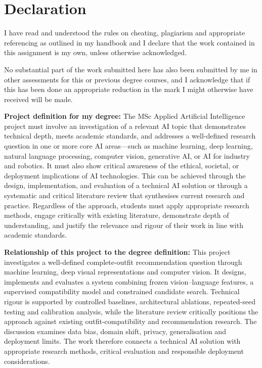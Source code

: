 \chapter*{Declaration}

I have read and understood the rules on cheating, plagiarism and appropriate
referencing as outlined in my handbook and I declare that the work contained
in this assignment is my own, unless otherwise acknowledged.

No substantial part of the work submitted here has also been submitted by me
in other assessments for this or previous degree courses, and I acknowledge
that if this has been done an appropriate reduction in the mark I might
otherwise have received will be made.

\textbf{Project definition for my degree:} The MSc Applied Artificial
Intelligence project must involve an investigation of a relevant AI topic that
demonstrates technical depth, meets academic standards, and addresses a
well-defined research question in one or more core AI areas---such as machine
learning, deep learning, natural language processing, computer vision,
generative AI, or AI for industry and robotics. It must also show critical
awareness of the ethical, societal, or deployment implications of AI
technologies. This can be achieved through the design, implementation, and
evaluation of a technical AI solution or through a systematic and critical
literature review that synthesises current research and practice. Regardless
of the approach, students must apply appropriate research methods, engage
critically with existing literature, demonstrate depth of understanding, and
justify the relevance and rigour of their work in line with academic standards.

\textbf{Relationship of this project to the degree definition:} This project
investigates a well-defined complete-outfit recommendation question through
machine learning, deep visual representations and computer vision. It designs,
implements and evaluates a system combining frozen vision--language features,
a supervised compatibility model and constrained candidate search. Technical
rigour is supported by controlled baselines, architectural ablations,
repeated-seed testing and calibration analysis, while the literature review
critically positions the approach against existing outfit-compatibility and
recommendation research. The discussion examines data bias, domain shift,
privacy, generalisation and deployment limits. The work therefore connects a
technical AI solution with appropriate research methods, critical evaluation
and responsible deployment considerations.

\clearpage
